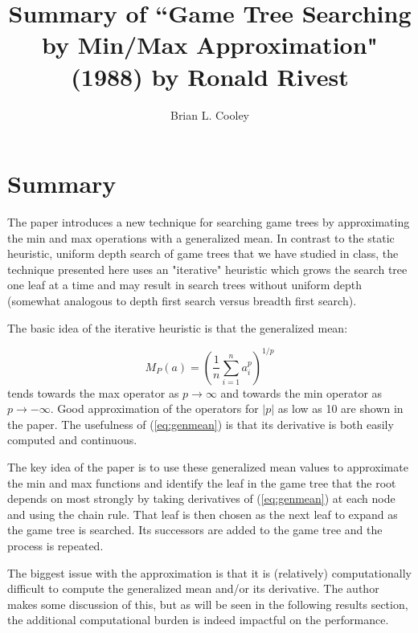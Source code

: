 \documentclass[11pt]{article}
\begin{document}
 

\setcounter{secnumdepth}{2}
\setcounter{page}{1}
\setcounter{equation}{0}
\title{\vspace{-3cm}Summary of ``Game Tree Searching by Min/Max Approximation" (1988) by Ronald Rivest}
\author{Brian L. Cooley}
\maketitle
\maketitle

\vspace{-1.5cm}
\section{Summary}
\vspace{-0.5cm}
The paper introduces a new technique for searching game trees by approximating the min and max operations with a generalized mean. In contrast to the static heuristic, uniform depth search of game trees that we have studied in class, the technique presented here uses an "iterative" heuristic which grows the search tree one leaf at a time and may result in search trees without uniform depth (somewhat analogous to depth first search versus breadth first search).

The basic idea of the iterative heuristic is that the generalized mean:

\begin{equation}
\label{eq:genmean}
M_P(a) = \left( \frac{1}{n} \sum_{i=1}^{n} a_i^p \right)^{1/p}
\end{equation}
tends towards the max operator as $p \rightarrow \infty$ and towards the min operator as $p \rightarrow -\infty$. Good approximation of the operators for $\left|p\right|$ as low as 10 are shown in the paper. The usefulness of (\ref{eq:genmean}) is that its derivative is both easily computed and continuous.

The key idea of the paper is to use these generalized mean values to approximate the min and max functions and identify the leaf in the game tree that the root depends on most strongly by taking derivatives of (\ref{eq:genmean}) at each node and using the chain rule. That leaf is then chosen as the next leaf to expand as the game tree is searched. Its successors are added to the game tree and the process is repeated.

The biggest issue with the approximation is that it is (relatively) computationally difficult to compute the generalized mean and/or its derivative. The author makes some discussion of this, but as will be seen in the following results section, the additional computational burden is indeed impactful on the performance.
\end{document}
